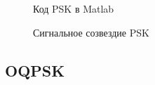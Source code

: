 \documentclass[a4paper,14pt]{extarticle}
\begin{document}
\begin{figure}[H]
\caption{Код PSK в Matlab}
\label{3}
\end{figure}

\begin{figure}[H]
\caption{Сигнальное созвездие PSK}
\label{4}
\end{figure}

\subsection{OQPSK}
\end{document}
